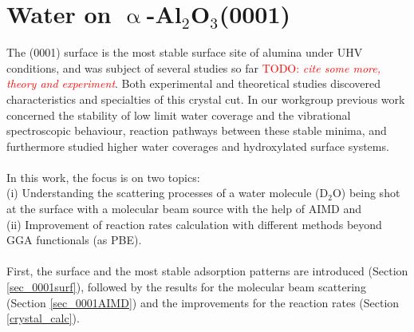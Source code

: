 \documentclass[11pt,DIV=13,BCOR=5mm,a4paper,headinclude]{scrbook}
\newcommand\todo[1]{\textcolor{red}{TODO: \textit{{#1}}}}
\begin{document}
% 


\chapter{Water on $\upalpha$-Al$_2$O$_3$(0001)}
The (0001) surface is the most stable surface site of alumina under UHV conditions, and was subject of several studies so far\cite{kuri10,hass98,hass00,Elam1998} \todo{cite some more, theory and experiment}.
Both experimental and theoretical studies discovered characteristics and specialties of this crystal cut.
In our workgroup previous work concerned the stability of low limit water coverage and the vibrational spectroscopic behaviour, reaction pathways between these stable minima, and furthermore studied higher water coverages and hydroxylated surface systems\cite{WirthJPCC2012,Wirth2014,Wirth2015}.
\\\\
In this work, the focus is on two topics:
\\
(i) Understanding the scattering processes of a water molecule (D$_2$O) being shot at the surface with a molecular beam source with the help of AIMD and
\\
(ii) Improvement of reaction rates calculation with different methods beyond GGA functionals (as PBE).
\\\\
First, the surface and the most stable adsorption patterns are introduced (Section \ref{sec_0001surf}), followed by the results for the molecular beam scattering\cite{Heiden0001_2018} (Section \ref{sec_0001AIMD}) and the improvements for the reaction rates (Section \ref{crystal_calc}).
	
\end{document}
